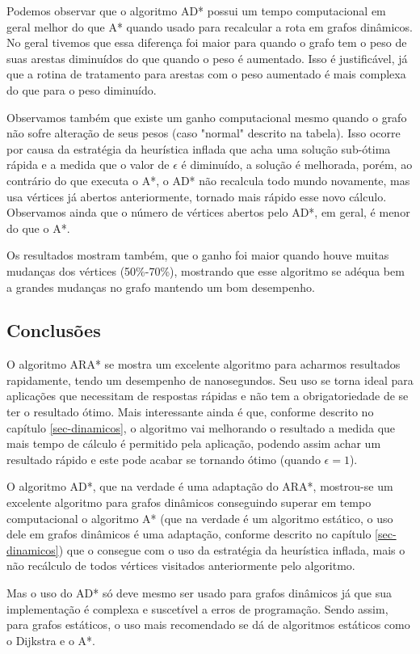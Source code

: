Podemos observar que o algoritmo AD* possui um tempo computacional em geral melhor do que A* quando usado para recalcular a rota em grafos dinâmicos. No geral tivemos que essa diferença foi maior para quando o grafo tem o peso de suas arestas diminuídos do que quando o peso é aumentado. Isso é justificável, já que a rotina de tratamento para arestas com o peso aumentado é mais complexa do que para o peso diminuído.

Observamos também que existe um ganho computacional mesmo quando o grafo não sofre alteração de seus pesos (caso "normal" descrito na tabela). Isso ocorre por causa da estratégia da heurística inflada que acha uma solução sub-ótima rápida e a medida que  o valor de $\epsilon$ é diminuído, a solução é melhorada, porém, ao contrário do que executa o A*, o AD* não recalcula todo mundo novamente, mas usa vértices já abertos anteriormente, tornado mais rápido esse novo cálculo. Observamos ainda que o número de vértices abertos pelo AD*, em geral, é menor do que o A*.

Os resultados mostram também, que o ganho foi maior quando houve muitas mudanças dos vértices (50\%-70\%), mostrando que esse algoritmo se adéqua bem a grandes mudanças no grafo mantendo um bom desempenho.

\subsection{Conclusões}
\label{sec-experimentos-dinamicos-conclusao}

O algoritmo ARA* se mostra um excelente algoritmo para acharmos resultados rapidamente, tendo um desempenho de nanosegundos. Seu uso se torna ideal para aplicações que necessitam de respostas rápidas e não tem a obrigatoriedade de se ter o resultado ótimo. Mais interessante ainda é que, conforme descrito no capítulo \ref{sec-dinamicos}, o algoritmo vai melhorando o resultado a medida que mais tempo de cálculo é permitido pela aplicação, podendo assim achar um resultado rápido e este pode acabar se tornando ótimo (quando $\epsilon = 1$).

O algoritmo AD*, que na verdade é uma adaptação do ARA*, mostrou-se um excelente algoritmo para grafos dinâmicos conseguindo superar em tempo computacional o algoritmo A* (que na verdade é um algoritmo estático, o uso dele em grafos dinâmicos é uma adaptação, conforme descrito no capítulo \ref{sec-dinamicos}) que o consegue com o uso da estratégia da heurística inflada, mais o não recálculo de todos vértices visitados anteriormente pelo algoritmo.

Mas o uso do AD* só deve mesmo ser usado para grafos dinâmicos já que sua implementação é complexa e suscetível a erros de programação. Sendo assim, para grafos estáticos, o uso mais recomendado se dá de algoritmos estáticos como o Dijkstra e o A*.